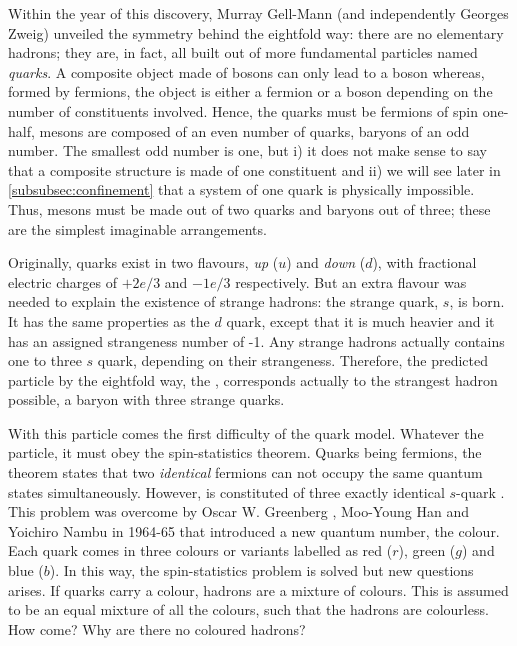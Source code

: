 Within the year of this discovery, Murray Gell-Mann (and independently Georges Zweig) unveiled the symmetry behind the eightfold way: there are no elementary hadrons; they are, in fact, all built out of more fundamental particles named \textit{quarks}. A composite object made of bosons can only lead to a boson whereas, formed by fermions, the object is either a fermion or a boson depending on the number of constituents involved. Hence, the quarks must be fermions of spin one-half, mesons are composed of an even number of quarks, baryons of an odd number. The smallest odd number is one, but i) it does not make sense to say that a composite structure is made of one constituent and ii) we will see later in \Sec\ref{subsubsec:confinement} that a system of one quark is physically impossible. Thus, mesons must be made out of two quarks and baryons out of three; these are the simplest imaginable arrangements. 

Originally, quarks exist in two flavours, \textit{up} ($u$) and \textit{down} ($d$), with fractional electric charges of $+2e/3$ and $-1e/3$ respectively. But an extra flavour was needed to explain the existence of strange hadrons: the strange quark, $s$, is born. It has the same properties as the $d$ quark, except that it is much heavier and it has an assigned strangeness number of -1. Any strange hadrons actually contains one to three $s$ quark, depending on their strangeness. Therefore, the predicted particle by the eightfold way, the \rmOmegaM, corresponds actually to the strangest hadron possible, a baryon with three strange quarks. 

With this particle comes the first difficulty of the quark model. Whatever the particle, it must obey the spin-statistics theorem. Quarks being fermions, the theorem states that two \textit{identical} fermions can not occupy the same quantum states simultaneously. However, \rmOmegaM is constituted of three exactly identical $s$-quark \cite{skandsIntroductionQCD2013}. This problem was overcome by Oscar W. Greenberg \cite{greenbergSpinUnitarySpinIndependence1964}, Moo-Young Han and Yoichiro Nambu \cite{hanThreeTripletModelDouble1965} in 1964-65 that introduced a new quantum number, the colour. Each quark comes in three colours or variants labelled as red ($r$), green ($g$) and blue ($b$). In this way, the spin-statistics problem is solved but new questions arises. If quarks carry a colour, hadrons are a mixture of colours. This is assumed to be an equal mixture of all the colours, such that the hadrons are colourless. How come? Why are there no coloured hadrons? 

